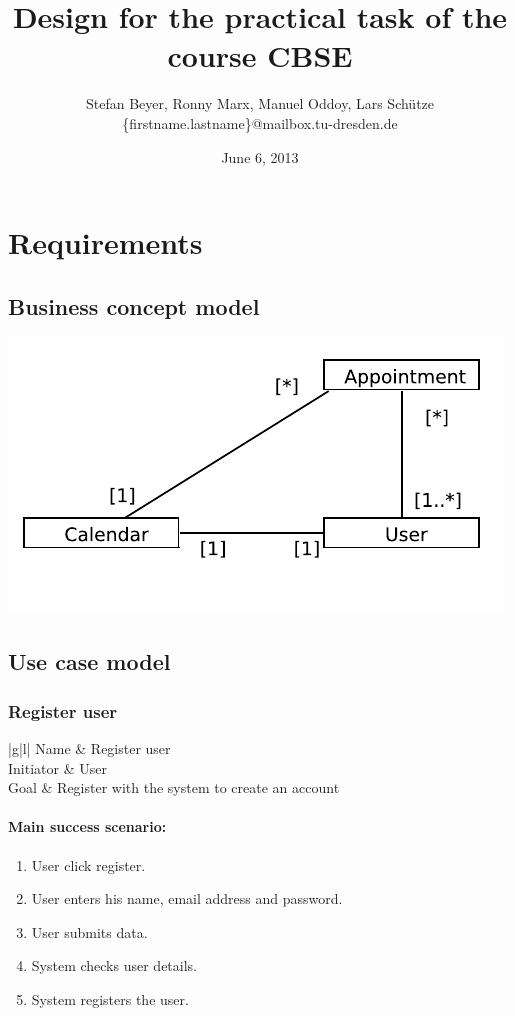 \documentclass[a4paper]{scrartcl}
\title{Design for the practical task of the course CBSE}
\author{Stefan Beyer, Ronny Marx, Manuel Oddoy, Lars Schütze \\
	\{firstname.lastname\}@mailbox.tu-dresden.de}
\date{June 6, 2013}
\begin{document}
\maketitle
\pagebreak

\tableofcontents
\pagebreak

\section{Requirements}
\subsection{Business concept model}

\includegraphics{pictures/BusinessConceptModel}

\subsection{Use case model}
\subsubsection{Register user}

\begin{tabular}{|g|l|}
	\hline Name      & Register user                                 \\ 
	\hline Initiator & User                                          \\ 
	\hline Goal      & Register with the system to create an account \\ 
	\hline
\end{tabular}

\paragraph{Main success scenario:}
\begin{enumerate}
	\item User click register.
	\item User enters his name, email address and password.
	\item User submits data.
	\item System checks user details.
	\item System registers the user.
\end{enumerate}
\end{document}
